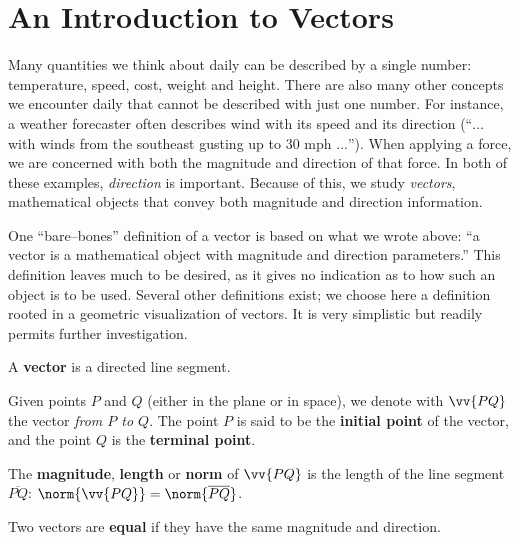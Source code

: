 \section{An Introduction to Vectors}\label{sec:vector_intro}

Many quantities we think about daily can be described by a single number: temperature, speed, cost, weight and height. There are also many other concepts we encounter daily that cannot be described with just one number. For instance, a weather forecaster often describes wind with its speed and its direction (``$\ldots$ with winds from the southeast gusting up to 30 mph $\ldots$''). When applying a force, we are concerned with both the magnitude and direction of that force. In both of these examples, \textit{direction} is important. Because of this, we study \textit{vectors}, mathematical objects that convey both magnitude and direction information.\bigskip

One ``bare--bones'' definition of a vector is based on what we wrote above: ``a vector is a mathematical object with magnitude and direction parameters.'' This definition leaves much to be desired, as it gives no indication as to how such an object is to be used. Several other definitions exist; we choose here a definition rooted in a geometric visualization of vectors. It is very simplistic but readily permits further investigation.


{A \textbf{vector} is a directed line segment.\bigskip

Given points $P$ and $Q$ (either in the plane or in space), we denote with $\vv{PQ}$ the vector \textit{from $P$ to $Q$}. The point $P$ is said to be the \textbf{initial point} of the vector, and the point $Q$ is the \textbf{terminal point}. \bigskip

The \textbf{magnitude}, \textbf{length} or \textbf{norm} of $\vv{PQ}$ is the length of the line segment $\overline{PQ}$: $\norm{\vv{PQ}} = \norm{\overline{PQ}}$.\bigskip

Two vectors are \textbf{equal} if they have the same magnitude and direction.
}

